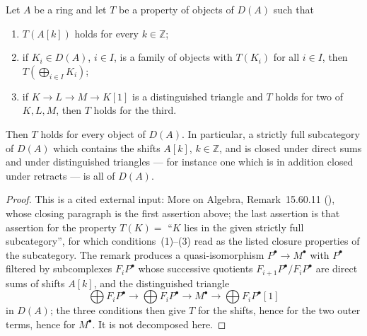 \begin{lemma}
\label{lem:pc-derived-generation}
Let $A$ be a ring and let $T$ be a property of objects of $D(A)$ such
that
\begin{enumerate}
\item $T(A[k])$ holds for every $k\in\mathbb Z$;
\item if $K_i\in D(A)$, $i\in I$, is a family of objects with $T(K_i)$
  for all $i\in I$, then $T(\bigoplus_{i\in I}K_i)$;
\item if $K\to L\to M\to K[1]$ is a distinguished triangle and $T$ holds
  for two of $K,L,M$, then $T$ holds for the third.
\end{enumerate}
Then $T$ holds for every object of $D(A)$.  In particular, a strictly
full subcategory of $D(A)$ which contains the shifts $A[k]$,
$k\in\mathbb Z$, and is closed under direct sums and under distinguished
triangles --- for instance one which is in addition closed under
retracts --- is all of $D(A)$.
\end{lemma}
\begin{proof}
This is a cited external input: More on Algebra,
Remark~15.60.11 (), whose
closing paragraph is the first assertion above; the last assertion is
that assertion for the property $T(K)=$ ``$K$ lies in the given strictly
full subcategory'', for which conditions~(1)--(3) read as the listed
closure properties of the subcategory.  The remark produces a
quasi-isomorphism $P^\bullet\to M^\bullet$ with $P^\bullet$ filtered by
subcomplexes $F_iP^\bullet$ whose successive quotients
$F_{i+1}P^\bullet/F_iP^\bullet$ are direct sums of shifts $A[k]$, and
the distinguished triangle
\[
\bigoplus F_iP^\bullet\to\bigoplus F_iP^\bullet\to M^\bullet\to
\bigoplus F_iP^\bullet[1]
\]
in $D(A)$; the three conditions then give $T$ for the shifts, hence for
the two outer terms, hence for $M^\bullet$.  It is not decomposed here.
\end{proof}

